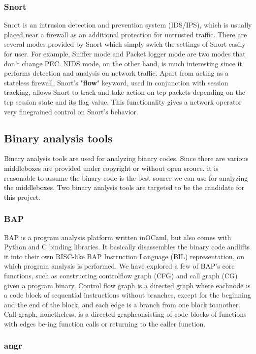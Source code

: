 \subsubsection{Snort}

Snort is an intrusion detection and prevention system (IDS/IPS), which is
usually placed near a firewall as an additional protection for untrusted
traffic.  There are several modes provided by Snort which simply swich the
settings of Snort easily for user.  For example, Sniffer mode and Packet logger
mode are two modes that don't change PEC.  NIDS mode, on the other hand, is much
interesting since it performs detection and analysis on network traffic.  Apart
from acting as a stateless firewall, Snort's "\textbf{flow}" keyword, used in
conjunction with session tracking, allows Snort to track and take action on tcp
packets depending on the tcp session state and its flag value.  This
functionality gives a network operator very finegrained control on Snort's
behavior.


\subsection{Binary analysis tools}

Binary analysis tools are used for analyzing bianry codes.  Since there are
various middleboxes are provided under copyright or without open srouce, it is
reasonable to assume the binary code is the best source we can use for analyzing
the middleboxes.  Two binary analysis tools are targeted to be the candidate for
this project.

\subsubsection{BAP}

BAP is a program analysis platform written inOCaml, but also comes with Python
and C binding libraries.  It basically disassembles the binary code andlifts it
into their own RISC-like BAP Instruction Language (BIL) representation, on which
program analysis is performed.  We have explored a few of BAP's core functions,
such as constructing controlflow graph (CFG) and call graph (CG) given a program
binary.  Control flow graph is a directed graph where eachnode is a code block
of sequential instructions without branches, except for the beginning and the
end of the block, and each edge is a branch from one block toanother.  Call
graph,  nonetheless,  is a directed graphconsisting of code blocks of functions
with edges be-ing function calls or returning to the caller function.

\subsubsection{angr}

